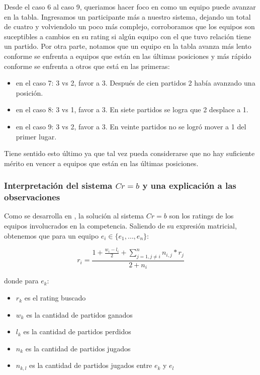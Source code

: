 Desde el caso 6 al caso 9, queriamos hacer foco en como un equipo puede avanzar en la tabla. Ingresamos un participante más a nuestro sistema, dejando un total de cuatro y volviendolo un poco más complejo, corroboramos que los equipos son suceptibles a cambios en su rating si algún equipo con el que tuvo relación tiene un partido. Por otra parte, notamos que un equipo en la tabla avanza más lento conforme se enfrenta a equipos que están en las últimas posiciones y más rápido conforme se enfrenta a otros que está en las primeras:

\begin{itemize}
    \item en el caso 7: 3 vs 2, favor a 3. Después de cien partidos 2 había avanzado una posición.
    \item en el caso 8: 3 vs 1, favor a 3. En siete partidos se logra que 2 desplace a 1.
    \item en el caso 9: 3 vs 2, favor a 3. En veinte partidos no se logró mover a 1 del primer lugar.
\end{itemize}

Tiene sentido esto último ya que tal vez pueda considerarse que no hay suficiente mérito en vencer a equipos que están en las últimas posiciones.

\subsubsection{Interpretación del sistema $Cr = b$ y una explicación a las observaciones}

Como se desarrolla en \cite{CMMpaper}, la solución al sistema $Cr = b$ son los ratings de los equipos involucrados en la competencia. Saliendo de su expresión matricial, obtenemos que para un equipo $e_i \in \{e_1, \dots, e_n\}$:

\begin{equation}
    r_i = \frac{1 + \frac{w_i - l_i}{2} + \sum_{j=1, j \neq i}^{n}{n_{i,j} * r_j}}{2 + n_i}    
\end{equation}

donde para $e_k$:

\begin{itemize}
    \item $r_k$ es el rating buscado
    \item $w_k$ es la cantidad de partidos ganados
    \item $l_k$ es la cantidad de partidos perdidos
    \item $n_k$ es la cantidad de partidos jugados
    \item $n_{k,l}$ es la cantidad de partidos jugados entre $e_k$ y $e_l$ 
\end{itemize}

